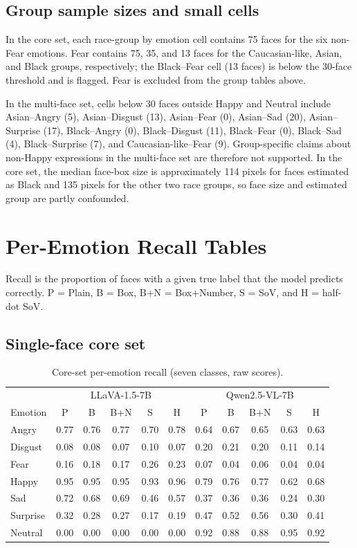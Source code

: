 \documentclass[lettersize,journal]{IEEEtran}
\begin{document}
\subsection{Group sample sizes and small cells}
In the core set, each race-group by emotion cell contains 75 faces for the six non-Fear emotions. Fear contains 75, 35, and 13 faces for the Caucasian-like, Asian, and Black groups, respectively; the Black--Fear cell (13 faces) is below the 30-face threshold and is flagged. Fear is excluded from the group tables above.

In the multi-face set, cells below 30 faces outside Happy and Neutral include Asian--Angry (5), Asian--Disgust (13), Asian--Fear (0), Asian--Sad (20), Asian--Surprise (17), Black--Angry (0), Black--Disgust (11), Black--Fear (0), Black--Sad (4), Black--Surprise (7), and Caucasian-like--Fear (9). Group-specific claims about non-Happy expressions in the multi-face set are therefore not supported. In the core set, the median face-box size is approximately 114 pixels for faces estimated as Black and 135 pixels for the other two race groups, so face size and estimated group are partly confounded.

\section{Per-Emotion Recall Tables}
\label{app:recall}
Recall is the proportion of faces with a given true label that the model predicts correctly. P = Plain, B = Box, B+N = Box+Number, S = SoV, and H = half-dot SoV.

\subsection{Single-face core set}
\begin{table}[!t]
\caption{Core-set per-emotion recall (seven classes, raw scores).}
\label{tab:app_recall_core}
\centering
\scriptsize
\setlength{\tabcolsep}{3pt}
\begin{tabular}{lccccc|ccccc}
\toprule
& \multicolumn{5}{c|}{LLaVA-1.5-7B} & \multicolumn{5}{c}{Qwen2.5-VL-7B} \\
Emotion & P & B & B+N & S & H & P & B & B+N & S & H \\
\midrule
Angry & 0.77 & 0.76 & 0.77 & 0.70 & 0.78 & 0.64 & 0.67 & 0.65 & 0.63 & 0.63 \\
Disgust & 0.08 & 0.08 & 0.07 & 0.10 & 0.07 & 0.20 & 0.21 & 0.20 & 0.11 & 0.14 \\
Fear & 0.16 & 0.18 & 0.17 & 0.26 & 0.23 & 0.07 & 0.04 & 0.06 & 0.04 & 0.04 \\
Happy & 0.95 & 0.95 & 0.95 & 0.93 & 0.96 & 0.79 & 0.76 & 0.77 & 0.62 & 0.68 \\
Sad & 0.72 & 0.68 & 0.69 & 0.46 & 0.57 & 0.37 & 0.36 & 0.36 & 0.24 & 0.30 \\
Surprise & 0.32 & 0.28 & 0.27 & 0.17 & 0.19 & 0.47 & 0.52 & 0.56 & 0.30 & 0.41 \\
Neutral & 0.00 & 0.00 & 0.00 & 0.00 & 0.00 & 0.92 & 0.88 & 0.88 & 0.95 & 0.92 \\
\bottomrule
\end{tabular}
\end{table}
\end{document}
